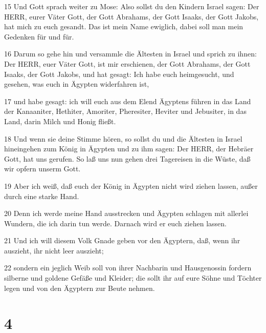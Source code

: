 \par 15 Und Gott sprach weiter zu Mose: Also sollst du den Kindern Israel sagen: Der HERR, eurer Väter Gott, der Gott Abrahams, der Gott Isaaks, der Gott Jakobs, hat mich zu euch gesandt. Das ist mein Name ewiglich, dabei soll man mein Gedenken für und für.
\par 16 Darum so gehe hin und versammle die Ältesten in Israel und sprich zu ihnen: Der HERR, euer Väter Gott, ist mir erschienen, der Gott Abrahams, der Gott Isaaks, der Gott Jakobs, und hat gesagt: Ich habe euch heimgesucht, und gesehen, was euch in Ägypten widerfahren ist,
\par 17 und habe gesagt: ich will euch aus dem Elend Ägyptens führen in das Land der Kanaaniter, Hethiter, Amoriter, Pheresiter, Heviter und Jebusiter, in das Land, darin Milch und Honig fließt.
\par 18 Und wenn sie deine Stimme hören, so sollst du und die Ältesten in Israel hineingehen zum König in Ägypten und zu ihm sagen: Der HERR, der Hebräer Gott, hat uns gerufen. So laß uns nun gehen drei Tagereisen in die Wüste, daß wir opfern unserm Gott.
\par 19 Aber ich weiß, daß euch der König in Ägypten nicht wird ziehen lassen, außer durch eine starke Hand.
\par 20 Denn ich werde meine Hand ausstrecken und Ägypten schlagen mit allerlei Wundern, die ich darin tun werde. Darnach wird er euch ziehen lassen.
\par 21 Und ich will diesem Volk Gnade geben vor den Ägyptern, daß, wenn ihr auszieht, ihr nicht leer auszieht;
\par 22 sondern ein jeglich Weib soll von ihrer Nachbarin und Hausgenossin fordern silberne und goldene Gefäße und Kleider; die sollt ihr auf eure Söhne und Töchter legen und von den Ägyptern zur Beute nehmen.

\chapter{4}

